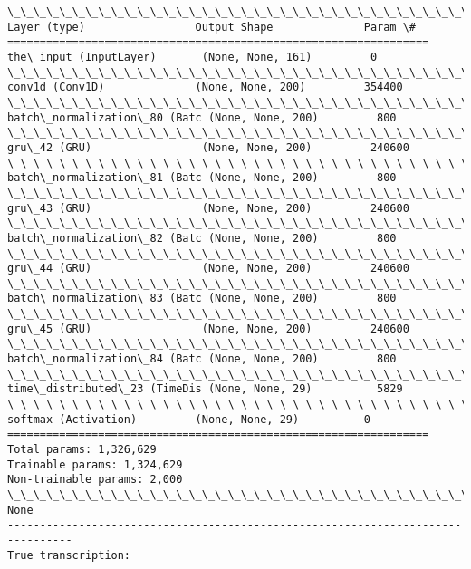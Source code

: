 \documentclass[11pt]{article}
\begin{document}
    \begin{Verbatim}[commandchars=\\\{\}]
\_\_\_\_\_\_\_\_\_\_\_\_\_\_\_\_\_\_\_\_\_\_\_\_\_\_\_\_\_\_\_\_\_\_\_\_\_\_\_\_\_\_\_\_\_\_\_\_\_\_\_\_\_\_\_\_\_\_\_\_\_\_\_\_\_
Layer (type)                 Output Shape              Param \#   
=================================================================
the\_input (InputLayer)       (None, None, 161)         0         
\_\_\_\_\_\_\_\_\_\_\_\_\_\_\_\_\_\_\_\_\_\_\_\_\_\_\_\_\_\_\_\_\_\_\_\_\_\_\_\_\_\_\_\_\_\_\_\_\_\_\_\_\_\_\_\_\_\_\_\_\_\_\_\_\_
conv1d (Conv1D)              (None, None, 200)         354400    
\_\_\_\_\_\_\_\_\_\_\_\_\_\_\_\_\_\_\_\_\_\_\_\_\_\_\_\_\_\_\_\_\_\_\_\_\_\_\_\_\_\_\_\_\_\_\_\_\_\_\_\_\_\_\_\_\_\_\_\_\_\_\_\_\_
batch\_normalization\_80 (Batc (None, None, 200)         800       
\_\_\_\_\_\_\_\_\_\_\_\_\_\_\_\_\_\_\_\_\_\_\_\_\_\_\_\_\_\_\_\_\_\_\_\_\_\_\_\_\_\_\_\_\_\_\_\_\_\_\_\_\_\_\_\_\_\_\_\_\_\_\_\_\_
gru\_42 (GRU)                 (None, None, 200)         240600    
\_\_\_\_\_\_\_\_\_\_\_\_\_\_\_\_\_\_\_\_\_\_\_\_\_\_\_\_\_\_\_\_\_\_\_\_\_\_\_\_\_\_\_\_\_\_\_\_\_\_\_\_\_\_\_\_\_\_\_\_\_\_\_\_\_
batch\_normalization\_81 (Batc (None, None, 200)         800       
\_\_\_\_\_\_\_\_\_\_\_\_\_\_\_\_\_\_\_\_\_\_\_\_\_\_\_\_\_\_\_\_\_\_\_\_\_\_\_\_\_\_\_\_\_\_\_\_\_\_\_\_\_\_\_\_\_\_\_\_\_\_\_\_\_
gru\_43 (GRU)                 (None, None, 200)         240600    
\_\_\_\_\_\_\_\_\_\_\_\_\_\_\_\_\_\_\_\_\_\_\_\_\_\_\_\_\_\_\_\_\_\_\_\_\_\_\_\_\_\_\_\_\_\_\_\_\_\_\_\_\_\_\_\_\_\_\_\_\_\_\_\_\_
batch\_normalization\_82 (Batc (None, None, 200)         800       
\_\_\_\_\_\_\_\_\_\_\_\_\_\_\_\_\_\_\_\_\_\_\_\_\_\_\_\_\_\_\_\_\_\_\_\_\_\_\_\_\_\_\_\_\_\_\_\_\_\_\_\_\_\_\_\_\_\_\_\_\_\_\_\_\_
gru\_44 (GRU)                 (None, None, 200)         240600    
\_\_\_\_\_\_\_\_\_\_\_\_\_\_\_\_\_\_\_\_\_\_\_\_\_\_\_\_\_\_\_\_\_\_\_\_\_\_\_\_\_\_\_\_\_\_\_\_\_\_\_\_\_\_\_\_\_\_\_\_\_\_\_\_\_
batch\_normalization\_83 (Batc (None, None, 200)         800       
\_\_\_\_\_\_\_\_\_\_\_\_\_\_\_\_\_\_\_\_\_\_\_\_\_\_\_\_\_\_\_\_\_\_\_\_\_\_\_\_\_\_\_\_\_\_\_\_\_\_\_\_\_\_\_\_\_\_\_\_\_\_\_\_\_
gru\_45 (GRU)                 (None, None, 200)         240600    
\_\_\_\_\_\_\_\_\_\_\_\_\_\_\_\_\_\_\_\_\_\_\_\_\_\_\_\_\_\_\_\_\_\_\_\_\_\_\_\_\_\_\_\_\_\_\_\_\_\_\_\_\_\_\_\_\_\_\_\_\_\_\_\_\_
batch\_normalization\_84 (Batc (None, None, 200)         800       
\_\_\_\_\_\_\_\_\_\_\_\_\_\_\_\_\_\_\_\_\_\_\_\_\_\_\_\_\_\_\_\_\_\_\_\_\_\_\_\_\_\_\_\_\_\_\_\_\_\_\_\_\_\_\_\_\_\_\_\_\_\_\_\_\_
time\_distributed\_23 (TimeDis (None, None, 29)          5829      
\_\_\_\_\_\_\_\_\_\_\_\_\_\_\_\_\_\_\_\_\_\_\_\_\_\_\_\_\_\_\_\_\_\_\_\_\_\_\_\_\_\_\_\_\_\_\_\_\_\_\_\_\_\_\_\_\_\_\_\_\_\_\_\_\_
softmax (Activation)         (None, None, 29)          0         
=================================================================
Total params: 1,326,629
Trainable params: 1,324,629
Non-trainable params: 2,000
\_\_\_\_\_\_\_\_\_\_\_\_\_\_\_\_\_\_\_\_\_\_\_\_\_\_\_\_\_\_\_\_\_\_\_\_\_\_\_\_\_\_\_\_\_\_\_\_\_\_\_\_\_\_\_\_\_\_\_\_\_\_\_\_\_
None
--------------------------------------------------------------------------------
True transcription:


\end{Verbatim}
\end{document}
